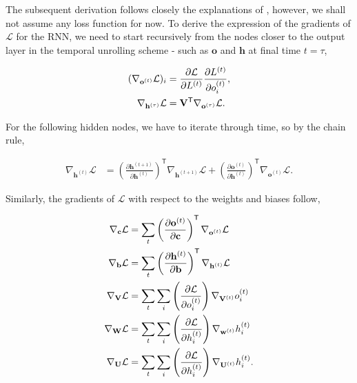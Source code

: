 The subsequent derivation follows closely the explanations of \cite{Goodfellow}, however, we shall not assume any loss function for now. To derive the expression of the gradients of $\mathcal{L}$ for the RNN, we need to start recursively from the nodes closer to the output layer in the temporal unrolling scheme - such as $\mathbf{o}$ and $\mathbf{h}$ at final time $t = \tau$,

\begin{align}
    (\nabla_{ \mathbf{o}^{(t)}} \mathcal{L})_{i} &= \frac{\partial \mathcal{L}}{\partial L^{(t)}}\frac{\partial L^{(t)}}{\partial o_{i}^{(t)}}, \notag\\
    \nabla_{\mathbf{h}^{(\tau)}} \mathcal{L} &= \mathbf{V}^\mathsf{T}\nabla_{ \mathbf{o}^{(\tau)}} \mathcal{L}.
    \label{eq:rnn_gradients1}
\end{align}

For the following hidden nodes, we have to iterate through time, so by the chain rule, 

\begin{align}
    \nabla_{\mathbf{h}^{(t)}} \mathcal{L} &= \left(\frac{\partial\mathbf{h}^{(t+1)}}{\partial\mathbf{h}^{(t)}}\right)^\mathsf{T}\nabla_{\mathbf{h}^{(t+1)}}\mathcal{L} + \left(\frac{\partial\mathbf{o}^{(t)}}{\partial\mathbf{h}^{(t)}}\right)^\mathsf{T}\nabla_{ \mathbf{o}^{(t)}} \mathcal{L}.
    \label{eq:rnn_gradients2}
\end{align}

Similarly, the gradients of $\mathcal{L}$ with respect to the weights and biases follow,

\begin{align}
    \nabla_{\mathbf{c}} \mathcal{L} &=\sum_{t}\left(\frac{\partial \mathbf{o}^{(t)}}{\partial \mathbf{c}}\right)^\mathsf{T} \nabla_{\mathbf{o}^{(t)}} \mathcal{L} \notag\\
    \nabla_{\mathbf{b}} \mathcal{L} &=\sum_{t}\left(\frac{\partial \mathbf{h}^{(t)}}{\partial \mathbf{b}}\right)^\mathsf{T}        \nabla_{\mathbf{h}^{(t)}} \mathcal{L} \notag\\
    \nabla_{\mathbf{V}} \mathcal{L} &=\sum_{t}\sum_{i}\left(\frac{\partial \mathcal{L}}{\partial o_i^{(t)} }\right)\nabla_{\mathbf{V}^{(t)}}o_i^{(t)} \notag\\
    \nabla_{\mathbf{W}} \mathcal{L} &=\sum_{t}\sum_{i}\left(\frac{\partial \mathcal{L}}{\partial h_i^{(t)}}\right)\nabla_{\mathbf{w}^{(t)}} h_i^{(t)} \notag\\
    \nabla_{\mathbf{U}} \mathcal{L} &=\sum_{t}\sum_{i}\left(\frac{\partial \mathcal{L}}{\partial h_i^{(t)}}\right)\nabla_{\mathbf{U}^{(t)}}h_i^{(t)}.
    \label{eq:rnn_gradients3}
\end{align}


